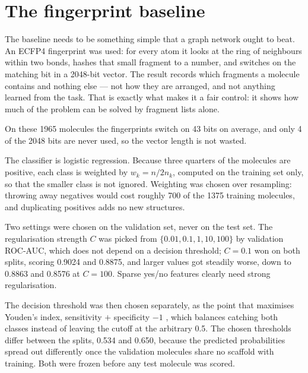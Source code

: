 \section{The fingerprint baseline}
\label{part:base}

The baseline needs to be something simple that a graph network ought to beat. An ECFP4 fingerprint \parencite{ECFP} was used: for every atom it looks at the ring of neighbours within two bonds, hashes that small fragment to a number, and switches on the matching bit in a 2048-bit vector. The result records which fragments a molecule contains and nothing else --- not how they are arranged, and not anything learned from the task. That is exactly what makes it a fair control: it shows how much of the problem can be solved by fragment lists alone.

On these 1965 molecules the fingerprints switch on 43 bits on average, and only 4 of the 2048 bits are never used, so the vector length is not wasted.

The classifier is logistic regression. Because three quarters of the molecules are positive, each class is weighted by $w_k = n / 2n_k$, computed on the training set only, so that the smaller class is not ignored. Weighting was chosen over resampling: throwing away negatives would cost roughly 700 of the 1375 training molecules, and duplicating positives adds no new structures.

Two settings were chosen on the validation set, never on the test set. The regularisation strength $C$ was picked from $\{0.01, 0.1, 1, 10, 100\}$ by validation ROC-AUC, which does not depend on a decision threshold; $C = 0.1$ won on both splits, scoring 0.9024 and 0.8875, and larger values got steadily worse, down to 0.8863 and 0.8576 at $C = 100$. Sparse yes/no features clearly need strong regularisation.

The decision threshold was then chosen separately, as the point that maximises Youden's index, sensitivity $+$ specificity $-1$ \parencite{Youden}, which balances catching both classes instead of leaving the cutoff at the arbitrary 0.5. The chosen thresholds differ between the splits, 0.534 and 0.650, because the predicted probabilities spread out differently once the validation molecules share no scaffold with training. Both were frozen before any test molecule was scored.
